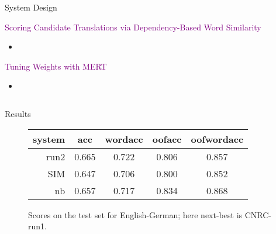 \documentclass[final,t]{beamer}
\begin{document}
\begin{frame}{}
\begin{columns}[t]
\begin{column}{.6\linewidth}
\begin{block}{System Design}
\begin{center}


  \textcolor{purple}{Scoring Candidate Translations via Dependency-Based Word Similarity}
  \begin{itemize}
  \item 
  \end{itemize}

  \textcolor{purple}{Tuning Weights with MERT}
  \begin{itemize}
  \item 
  \end{itemize}

\end{center}

\end{block}

    \end{column}
  \end{columns}

\begin{columns}
  \begin{column}{.64\linewidth}

\begin{block}{Results}

\begin{figure}[t]
  \begin{center}
  \begin{tabular}{|r|c|c|c|c|}
    \hline
    system & acc      & wordacc  & oofacc & oofwordacc \\
    \hline
    run2  &  0.665 & 0.722  &  0.806  & 0.857 \\
    SIM    &  0.647 & 0.706 & 0.800 & 0.852 \\
    nb     &  0.657   & 0.717   & 0.834 & 0.868    \\
    \hline
  \end{tabular}
  \end{center}
\caption{Scores on the test set for English-German; here next-best is CNRC-run1.}
\label{fig:theresults-en-de}
\end{figure}


\end{block}
\end{column}
\end{columns}
\end{frame}
\end{document}
